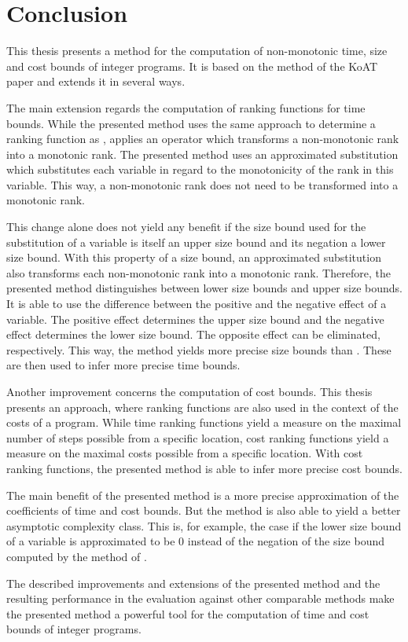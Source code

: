 \section{Conclusion}

This thesis presents a method for the computation of non-monotonic time, size and cost bounds of integer programs.
It is based on the method of the KoAT paper \cite{koat} and extends it in several ways.

The main extension regards the computation of ranking functions for time bounds.
While the presented method uses the same approach to determine a ranking function as \cite{koat}, \cite{koat} applies an operator which transforms a non-monotonic rank into a monotonic rank.
The presented method uses an approximated substitution which substitutes each variable in regard to the monotonicity of the rank in this variable.
This way, a non-monotonic rank does not need to be transformed into a monotonic rank.

This change alone does not yield any benefit if the size bound used for the substitution of a variable is itself an upper size bound and its negation a lower size bound.
With this property of a size bound, an approximated substitution also transforms each non-monotonic rank into a monotonic rank.
Therefore, the presented method distinguishes between lower size bounds and upper size bounds.
It is able to use the difference between the positive and the negative effect of a variable.
The positive effect determines the upper size bound and the negative effect determines the lower size bound.
The opposite effect can be eliminated, respectively.
This way, the method yields more precise size bounds than \cite{koat}.
These are then used to infer more precise time bounds.

Another improvement concerns the computation of cost bounds.
This thesis presents an approach, where ranking functions are also used in the context of the costs of a program.
While time ranking functions yield a measure on the maximal number of steps possible from a specific location, cost ranking functions yield a measure on the maximal costs possible from a specific location.
With cost ranking functions, the presented method is able to infer more precise cost bounds.

The main benefit of the presented method is a more precise approximation of the coefficients of time and cost bounds.
But the method is also able to yield a better asymptotic complexity class.
This is, for example, the case if the lower size bound of a variable is approximated to be $0$ instead of the negation of the size bound computed by the method of \cite{koat}.

The described improvements and extensions of the presented method and the resulting performance in the evaluation against other comparable methods make the presented method a powerful tool for the computation of time and cost bounds of integer programs.
